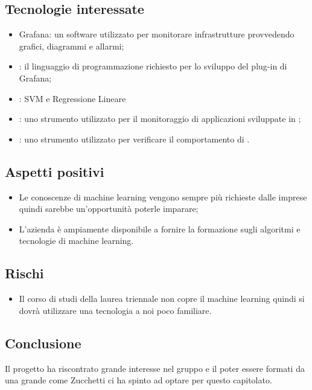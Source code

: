 \documentclass[../studio-di-fattibilita.tex]{subfiles}
\begin{document}
\subsection{Tecnologie interessate}%
\label{sub:tecnologie_interessate}
\begin{itemize}
  \item Grafana: un software  utilizzato per monitorare infrastrutture provvedendo grafici, diagrammi e allarmi;
  \item {}: il linguaggio di programmazione richiesto per lo sviluppo del plug-in di Grafana;
  \item {}: SVM e Regressione Lineare
  \item {}: uno strumento utilizzato per il monitoraggio di applicazioni sviluppate in ;
  \item {}: uno strumento utilizzato per verificare il comportamento di .
\end{itemize}

\subsection{Aspetti positivi}%
\label{sub:aspetti_positivi}
\begin{itemize}
  \item Le conoscenze di machine learning vengono sempre più richieste dalle imprese quindi sarebbe un’opportunità poterle imparare;
  \item L’azienda è ampiamente disponibile a fornire la formazione sugli algoritmi e tecnologie di machine learning.
\end{itemize}

\subsection{Rischi}%
\label{sub:rischi}
\begin{itemize}
  \item Il corso di studi della laurea triennale non copre il machine learning quindi si dovrà utilizzare una tecnologia a noi poco familiare.
\end{itemize}

\subsection{Conclusione}%
\label{sub:conclusione}
Il progetto ha riscontrato grande interesse nel gruppo e il poter essere formati da una grande  come Zucchetti ci ha spinto ad optare per questo capitolato.
\end{document}
